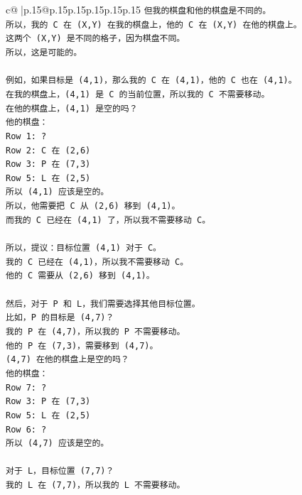 \documentclass{article}
\begin{document}
{\begin{supertabular}{c@{$\;$}|p{.15\linewidth}@{}p{.15\linewidth}p{.15\linewidth}p{.15\linewidth}p{.15\linewidth}p{.15\linewidth}}
{{{\texttt{但我的棋盘和他的棋盘是不同的。} \\
\texttt{所以，我的 C 在 (X,Y) 在我的棋盘上，他的 C 在 (X,Y) 在他的棋盘上。} \\
\texttt{这两个 (X,Y) 是不同的格子，因为棋盘不同。} \\
\texttt{所以，这是可能的。} \\
\\ 
\texttt{例如，如果目标是 (4,1)，那么我的 C 在 (4,1)，他的 C 也在 (4,1)。} \\
\texttt{在我的棋盘上，(4,1) 是 C 的当前位置，所以我的 C 不需要移动。} \\
\texttt{在他的棋盘上，(4,1) 是空的吗？} \\
\texttt{他的棋盘：} \\
\texttt{Row 1: ?} \\
\texttt{Row 2: C 在 (2,6)} \\
\texttt{Row 3: P 在 (7,3)} \\
\texttt{Row 5: L 在 (2,5)} \\
\texttt{所以 (4,1) 应该是空的。} \\
\texttt{所以，他需要把 C 从 (2,6) 移到 (4,1)。} \\
\texttt{而我的 C 已经在 (4,1) 了，所以我不需要移动 C。} \\
\\ 
\texttt{所以，提议：目标位置 (4,1) 对于 C。} \\
\texttt{我的 C 已经在 (4,1)，所以我不需要移动 C。} \\
\texttt{他的 C 需要从 (2,6) 移到 (4,1)。} \\
\\ 
\texttt{然后，对于 P 和 L，我们需要选择其他目标位置。} \\
\texttt{比如，P 的目标是 (4,7)？} \\
\texttt{我的 P 在 (4,7)，所以我的 P 不需要移动。} \\
\texttt{他的 P 在 (7,3)，需要移到 (4,7)。} \\
\texttt{(4,7) 在他的棋盘上是空的吗？} \\
\texttt{他的棋盘：} \\
\texttt{Row 7: ?} \\
\texttt{Row 3: P 在 (7,3)} \\
\texttt{Row 5: L 在 (2,5)} \\
\texttt{Row 6: ?} \\
\texttt{所以 (4,7) 应该是空的。} \\
\\ 
\texttt{对于 L，目标位置 (7,7)？} \\
\texttt{我的 L 在 (7,7)，所以我的 L 不需要移动。} \\
            }
        }
    }
     \\ \\


\end{supertabular}}
\end{document}
